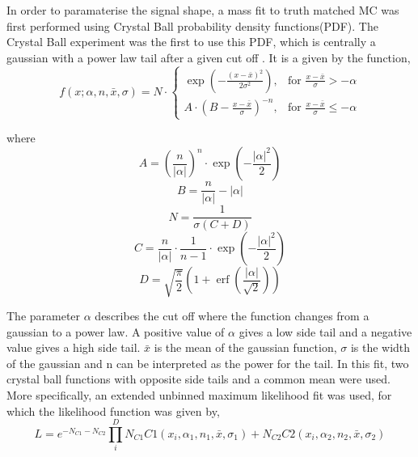 In order to paramaterise the signal shape, a mass fit to truth matched MC was first performed using Crystal Ball probability density functions(PDF).  The Crystal Ball experiment was the first to use this PDF, which is centrally a gaussian with a power law tail after a given cut off \cite{CrystallBall}.  It is a given by the function,
\begin{equation}
f(x;\alpha,n,\bar x,\sigma) = N \cdot \begin{cases} \exp(- \frac{(x - \bar x)^2}{2 \sigma^2}), & \mbox{for }\frac{x - \bar x}{\sigma} > -\alpha \\
  A \cdot (B - \frac{x - \bar x}{\sigma})^{-n}, & \mbox{for }\frac{x - \bar x}{\sigma} \leqslant -\alpha \end{cases}
\end{equation}

where
\begin{equation}
  A = \left(\frac{n}{\left| \alpha \right|}\right)^n \cdot \exp\left(- \frac {\left| \alpha \right|^2}{2}\right)
\end{equation}
\begin{equation}
  B = \frac{n}{\left| \alpha \right|}  - \left| \alpha \right|
\end{equation}
\begin{equation}
  N = \frac{1}{\sigma (C + D)}
\end{equation}
  \begin{equation}
  C = \frac{n}{\left| \alpha \right|} \cdot \frac{1}{n-1} \cdot \exp\left(- \frac {\left| \alpha \right|^2}{2}\right)
  \end{equation}
  \begin{equation}
  D = \sqrt{\frac{\pi}{2}} \left(1 + \operatorname{erf}\left(\frac{\left| \alpha \right|}{\sqrt 2}\right)\right)
  \end{equation}

  The parameter $\alpha$ describes the cut off where the function changes from a gaussian to a power law. A positive value of $\alpha$ gives a low side tail and a negative value gives a high side tail.  $\bar{x}$ is the mean of the gaussian function, $\sigma$ is the width of the gaussian and n can be interpreted as the power for the tail.  In this fit, two crystal ball functions with opposite side tails and a common mean were used.  More specifically, an extended unbinned maximum likelihood fit was used, for which the likelihood function was given by,
  \begin{equation}
    L=e^{-N_{C1}-N_{C2}}\prod_i^{D}N_{C1}C1(x_i,\alpha_1,n_1,\bar{x},\sigma_1)+N_{C2}C2(x_i,\alpha_2,n_2,\bar{x},\sigma_2)
  \end{equation}

